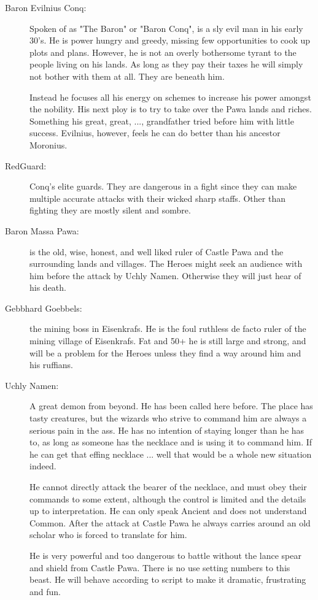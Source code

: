 \begin{description}
\item[Baron Evilnius Conq:] Spoken of as "The Baron" or "Baron Conq", is a sly evil man in his early 30's. He is power hungry and greedy, missing few opportunities to cook up plots and plans. However, he is not an overly bothersome tyrant to the people living on his lands. As long as they pay their taxes he will simply not bother with them at all. They are beneath him.

Instead he focuses all his energy on schemes to increase his power amongst the nobility. His next ploy is to try to take over the Pawa lands and riches. Something his great, great, ..., grandfather tried before him with little success. Evilnius, however, feels he can do better than his ancestor Moronius.


\item[RedGuard:] Conq's elite guards. They are dangerous in a fight since they can make multiple accurate attacks with their wicked sharp staffs. Other than fighting they are mostly silent and sombre.


\item[Baron Massa Pawa:] is the old, wise, honest, and well liked ruler of Castle Pawa and the surrounding lands and villages. The Heroes might seek an audience with him before the attack by Uchly Namen. Otherwise they will just hear of his death.


\item[Gebbhard Goebbels:] the mining boss in Eisenkrafs. He is the foul ruthless de facto ruler of the mining village of Eisenkrafs. Fat and 50+ he is still large and strong, and will be a problem for the Heroes unless they find a way around him and his ruffians.


\item[Uchly Namen:] A great demon from beyond. He has been called here before. The place has tasty creatures, but the wizards who strive to command him are always a serious pain in the ass. He has no intention of staying longer than he has to, as long as someone has the necklace and is using it to command him. If he can get that effing necklace ... well that would be a whole new situation indeed.

He cannot directly attack the bearer of the necklace, and must obey their commands to some extent, although the control is limited and the details up to interpretation. He can only speak Ancient and does not understand Common. After the attack at Castle Pawa he always carries around an old scholar who is forced to translate for him.

He is very powerful and too dangerous to battle without the lance spear and shield from Castle Pawa. There is no use setting numbers to this beast. He will behave according to script to make it dramatic, frustrating and fun.

\end{description}










